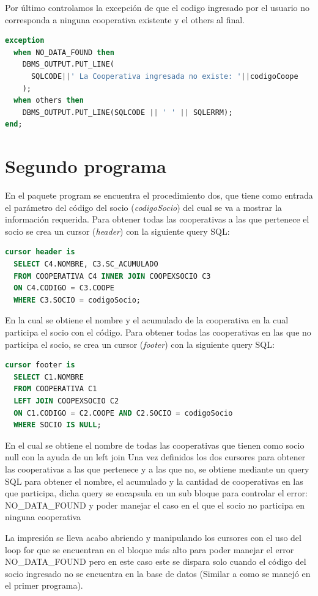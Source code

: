 \documentclass{article}
\begin{document}
Por último controlamos la excepción de que el codigo ingresado por el usuario no corresponda a ninguna cooperativa existente y el others al final.

\begin{lstlisting}[language=SQL,label={lst:lstlisting13}]
exception
  when NO_DATA_FOUND then
    DBMS_OUTPUT.PUT_LINE(
      SQLCODE||' La Cooperativa ingresada no existe: '||codigoCoope
    );
  when others then
    DBMS_OUTPUT.PUT_LINE(SQLCODE || ' ' || SQLERRM);
end;
\end{lstlisting}

\section{Segundo programa}
En el paquete program se encuentra el procedimiento dos, que tiene como entrada el parámetro del código del socio (\emph{codigoSocio}) del cual se va a mostrar la información requerida.
Para obtener todas las cooperativas a las que pertenece el socio se crea un cursor (\emph{header}) con la siguiente query SQL:

\begin{lstlisting}[language=SQL,label={lst:lstlisting14}]
cursor header is
  SELECT C4.NOMBRE, C3.SC_ACUMULADO
  FROM COOPERATIVA C4 INNER JOIN COOPEXSOCIO C3
  ON C4.CODIGO = C3.COOPE
  WHERE C3.SOCIO = codigoSocio;
\end{lstlisting}
En la cual se obtiene el nombre y el acumulado de la cooperativa en la cual participa el socio con el código.
Para obtener todas las cooperativas en las que no participa el socio, se crea un cursor (\emph{footer}) con la siguiente query SQL:
\begin{lstlisting}[language=SQL,label={lst:lstlisting15}]
cursor footer is
  SELECT C1.NOMBRE
  FROM COOPERATIVA C1
  LEFT JOIN COOPEXSOCIO C2
  ON C1.CODIGO = C2.COOPE AND C2.SOCIO = codigoSocio
  WHERE SOCIO IS NULL;
\end{lstlisting}
En el cual se obtiene el nombre de todas las cooperativas que tienen como socio null con la ayuda de un left join
Una vez definidos los dos cursores para obtener las cooperativas a las que pertenece y a las que no, se obtiene mediante un query SQL para obtener el nombre, el acumulado y la cantidad de cooperativas en las que participa, dicha query se encapsula en un sub bloque para controlar el error: NO\_DATA\_FOUND y poder manejar el caso en el que el socio no participa en ninguna cooperativa

La impresión se lleva acabo abriendo y manipulando los cursores con el uso del loop for que se encuentran en el bloque más alto para poder manejar el error NO\_DATA\_FOUND pero en este caso este se dispara solo cuando el código del socio ingresado no se encuentra en la base de datos (Similar a como se manejó en el primer programa).
\end{document}
